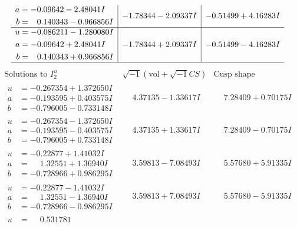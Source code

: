 \documentclass[1p]{elsarticle_modified}
\theoremstyle{definition}
\newcommand{\I}{\sqrt{-1}}
\begin{document}
$$\begin{array}{c|c|c}
\begin{aligned}
a &= -0.09642 - 2.48041 I \\
b &= \phantom{-}0.140343 - 0.966856 I\end{aligned}
 & -1.78344 - 2.09337 I & -0.51499 + 4.16283 I \\ \hline\begin{aligned}
u &= -0.086211 - 1.280080 I \\
a &= -0.09642 + 2.48041 I \\
b &= \phantom{-}0.140343 + 0.966856 I\end{aligned}
 & -1.78344 + 2.09337 I & -0.51499 - 4.16283 I\\
 \hline 
 \end{array}$$\newpage$$\begin{array}{c|c|c}  
\text{Solutions to }I^u_{2}& \I (\text{vol} + \sqrt{-1}CS) & \text{Cusp shape}\\
 \hline 
\begin{aligned}
u &= -0.267354 + 1.372650 I \\
a &= -0.193595 + 0.403575 I \\
b &= -0.796005 - 0.733148 I\end{aligned}
 & \phantom{-}4.37135 - 1.33617 I & \phantom{-}7.28409 + 0.70175 I \\ \hline\begin{aligned}
u &= -0.267354 - 1.372650 I \\
a &= -0.193595 - 0.403575 I \\
b &= -0.796005 + 0.733148 I\end{aligned}
 & \phantom{-}4.37135 + 1.33617 I & \phantom{-}7.28409 - 0.70175 I \\ \hline\begin{aligned}
u &= -0.22877 + 1.41032 I \\
a &= \phantom{-}1.32551 + 1.36940 I \\
b &= -0.728966 + 0.986295 I\end{aligned}
 & \phantom{-}3.59813 - 7.08493 I & \phantom{-}5.57680 + 5.91335 I \\ \hline\begin{aligned}
u &= -0.22877 - 1.41032 I \\
a &= \phantom{-}1.32551 - 1.36940 I \\
b &= -0.728966 - 0.986295 I\end{aligned}
 & \phantom{-}3.59813 + 7.08493 I & \phantom{-}5.57680 - 5.91335 I \\ \hline\begin{aligned}
u &= \phantom{-}0.531781\phantom{ +0.000000I} \\

\end{aligned}
\end{array}$$
\end{document}
